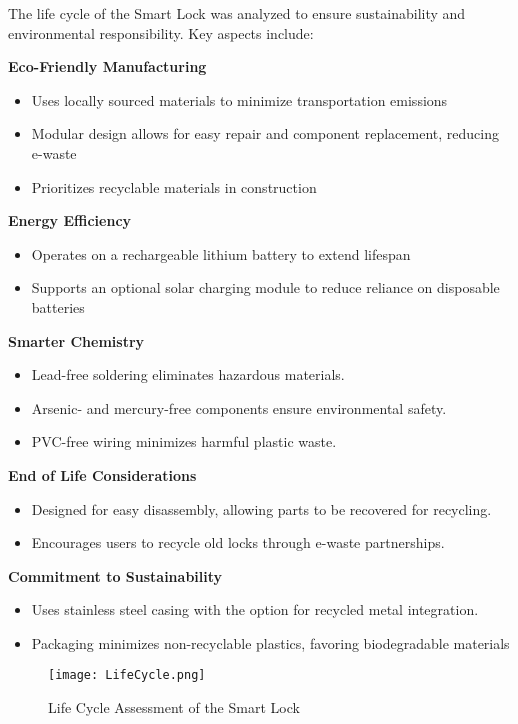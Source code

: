 The life cycle of the Smart Lock was analyzed to ensure sustainability and environmental responsibility. Key aspects include: \newline

\textbf{Eco-Friendly Manufacturing}
\begin{itemize}
    \item Uses locally sourced materials to minimize transportation emissions
    \item Modular design allows for easy repair and component replacement, reducing e-waste
    \item Prioritizes recyclable materials in construction
\end{itemize}

\textbf{Energy Efficiency}
\begin{itemize}
    \item Operates on a rechargeable lithium battery to extend lifespan
    \item Supports an optional solar charging module to reduce reliance on disposable batteries
\end{itemize}

\textbf{Smarter Chemistry}
\begin{itemize}
    \item Lead-free soldering eliminates hazardous materials.
    \item Arsenic- and mercury-free components ensure environmental safety.
    \item PVC-free wiring minimizes harmful plastic waste.
\end{itemize}

\textbf{End of Life Considerations}
\begin{itemize}
    \item Designed for easy disassembly, allowing parts to be recovered for recycling.
    \item Encourages users to recycle old locks through e-waste partnerships.
\end{itemize}

\textbf{Commitment to Sustainability}
\begin{itemize}
    \item Uses stainless steel casing with the option for recycled metal integration.
    \item Packaging minimizes non-recyclable plastics, favoring biodegradable materials
\end{itemize}

\begin{figure}[h]
    \centering
    \texttt{[image: LifeCycle.png]}
    \caption{Life Cycle Assessment of the Smart Lock}
    \label{fig:lifecycle}
\end{figure}